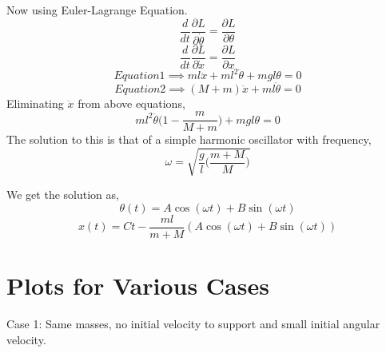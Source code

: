 \documentclass{article}
\begin{document}
	Now using Euler-Lagrange Equation.
	\begin{equation*}
	 	\frac{d}{dt}\frac{\partial L } {\partial \dot{\theta} } = \frac{\partial L}{\partial \theta} \tag{1}
	\end{equation*}
	\begin{equation*}
	 	\frac{d}{dt}\frac{\partial L } {\partial \dot{x} } = \frac{\partial L}{\partial x} \tag{2}
	\end{equation*}
	\begin{equation*}
	 	Equation 1 \implies ml\ddot{x}+ml^2\ddot{\theta}+mgl\theta=0	\tag{a}
	\end{equation*}
	\begin{equation*}
	 	Equation 2 \implies (M+m)\ddot{x}+ml\ddot{\theta}	= 0 \tag{b}
	\end{equation*}
 	Eliminating $ \ddot{x} $ from above equations,
 	\begin{equation*}
		ml^2\ddot{\theta}\biggr(1-\frac{m}{M+m}\biggr) + mgl\theta =0 	
    	\end{equation*}
 	The solution to this is that of a simple harmonic oscillator with frequency,
 	\[ \omega = \sqrt{\frac{g}{l}\biggr(\frac{m+M}{M}\biggr)} \]
 
 	We get the solution as,
 	\[ \theta(t) = A \cos(\omega t) + B \sin(\omega t) \]
 	\[ x(t) = Ct - \frac{ml}{m+M}(A \cos(\omega t) + B\sin(\omega t)) \]
 	\newpage
 
 	\section{Plots for Various Cases}
 	\centering
	Case 1:
	Same masses, no initial velocity to support and small initial angular velocity.
	\newline
	
\end{document}
